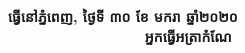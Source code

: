 \documentclass{classes/exam}
\begin{document}
\hspace{2pt}
	\begin{flushright}
	\textbf{\kob ធ្វើនៅភ្នំពេញ, ថ្ងៃទី ៣០ ខែ មករា ឆ្នាំ២០២០\\
				~~~~~~~~~~~~~~~~~អ្នកធ្វើអត្រាកំណែ}
	\end{flushright}
\end{document}
